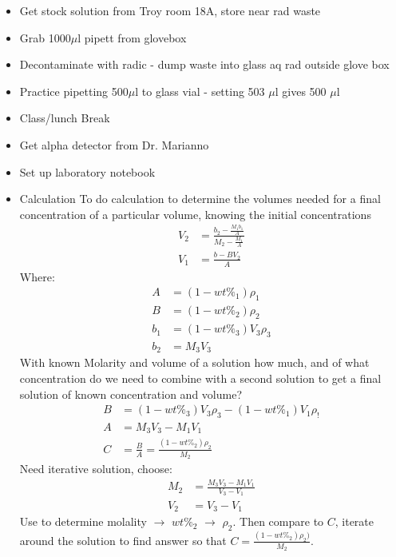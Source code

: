 \documentclass[idxtotoc,hyperref,openany,oneside]{labbook} %
\begin{document}

\begin{itemize}
\item{Get stock solution from Troy room 18A, store near rad waste}
\item{Grab 1000$\mu$l pipett from glovebox}
\item{Decontaminate with radic - dump waste into glass aq rad outside glove box}
\item{Practice pipetting 500$\mu$l to glass vial - setting 503 $\mu$l
  gives 500 $\mu$l}
\item{Class/lunch Break}
\item{Get alpha detector from Dr. Marianno}
\item{Set up laboratory notebook}
\item{Calculation}
  To do calculation to determine the volumes needed for a final
  concentration of a particular volume, knowing the initial
  concentrations
  \begin{align*}
    V_2&=\frac{b_2-\frac{M_1b_1}{A}}{M_2-\frac{M_1}{A}}\\
    V_1&=\frac{b-BV_2}{A}
  \end{align*}
  Where:
  \begin{align*}
    A&=(1-wt\%_1)\rho_1\\
    B&=(1-wt\%_2)\rho_2\\
    b_1&=(1-wt\%_3)V_3\rho_3\\
    b_2&=M_3V_3
  \end{align*}
  With known Molarity and volume of a solution
  how much, and of what concentration
  do we need to combine with a second solution
  to get a final solution of known concentration
  and volume?
  \begin{align*}
    B&=(1-wt\%_3)V_3\rho_3-(1-wt\%_1)V_1\rho_!\\
    A&=M_3V_3-M_1V_1\\
    C&=\frac{B}{A}=\frac{(1-wt\%_2)\rho_2}{M_2}
  \end{align*}
  Need iterative solution, choose:
  \begin{align*}
    M_2&=\frac{M_3V_3-M_1V_1}{V_3-V_1}\\
    V_2&=V_3-V_1
  \end{align*}
  Use to determine molality $\rightarrow$ $wt\%_2$ $\rightarrow$
  $\rho_2$. Then compare to $C$, iterate around the solution to
  find answer so that $C=\frac{(1-wt\%_2)\rho_2)}{M_2}$.
\end{itemize}

\end{document}
